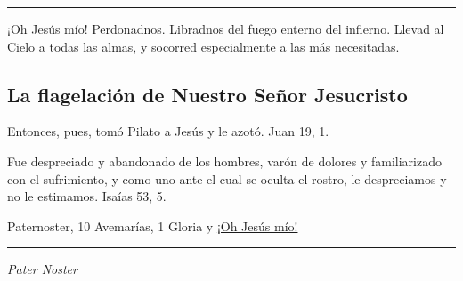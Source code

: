 \documentclass[a4paper,11pt, oneside]{report}
\begin{document}
\begin{center}\rule{1\linewidth}{\linethickness}\end{center}

\medskip
\hypertarget{finalHuerto}{¡Oh Jesús mío! Perdonadnos. Libradnos del fuego enterno del infierno. Llevad al Cielo a todas las almas, y socorred especialmente a las más 
necesitadas.}
  
\subsection*{La flagelación de Nuestro Señor Jesucristo}

Entonces, pues, tomó Pilato a Jesús y le azotó. Juan 19, 1.
    
\smallskip
Fue despreciado y abandonado de los hombres, varón de dolores y familiarizado con el sufrimiento, y como uno ante el cual
se oculta el rostro, le despreciamos y no le estimamos. Isaías 53, 5.      

 Paternoster, 10 Avemarías, 1 Gloria y \hyperlink{finalFlagelacion}{¡Oh Jesús mío!}

\medskip

\begin{center}\rule{1\linewidth}{\linethickness}\end{center}

\medskip
\textit{Pater Noster}
\end{document}
